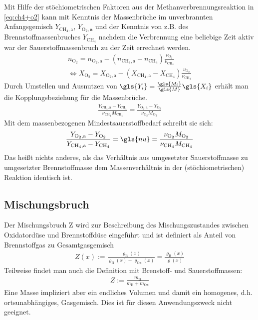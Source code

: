 Mit Hilfe der stöchiometrischen Faktoren aus der Methanverbrennungsreaktion in \autoref{eq:ch4+o2} kann mit Kenntnis der Massenbrüche im unverbrannten Anfangsgemisch $Y_{\mathrm{CH}_4,\text{a}}$, $Y_{\mathrm{O}_2,\textbf{a}}$ und der Kenntnis von z.B. des Brennstoffmassenbruches $Y_{\mathrm{CH}_4}$ nachdem die Verbrennung eine beliebige Zeit aktiv war der Sauerstoffmassenbruch zu der Zeit errechnet werden.
\label{pg:anfangsgemisch}
\begin{align}
    n_{\mathrm{O}_2} = n_{\mathrm{O}_2,\text{a}} - \left( n_{\mathrm{CH}_4,\text{a}}-n_{\mathrm{CH}_4} \right) \frac{ \nu_{\mathrm{O}_2} }{ \nu_{\mathrm{CH}_4} } \\
    \Leftrightarrow
    X_{\mathrm{O}_2} = X_{\mathrm{O}_2,\text{a}} - \left( X_{\mathrm{CH}_4,\text{a}}-X_{\mathrm{CH}_4} \right) \frac{ \nu_{\mathrm{O}_2} }{ \nu_{\mathrm{CH}_4} }
\end{align}
Durch Umstellen und Ausnutzen von $\gls{Y_i} = \frac{ \gls{M_i} }{ \gls{M} } \gls{X_i}$ erhält man die Kopplungsbeziehung für die Massenbrüche.
\begin{align}
   \frac{ Y_{\mathrm{CH}_4,\text{a}} - Y_{\mathrm{CH}_4} }{ \nu_{\mathrm{CH}_4} M_{\mathrm{CH}_4} }
   = \frac{ Y_{\mathrm{O}_2,\text{a}} - Y_{\mathrm{O}_2} }{ \nu_{\mathrm{O}_2} M_{\mathrm{O}_2} }
\end{align}
Mit dem massenbezogenen Mindestsauerstoffbedarf schreibt sie sich:
\begin{align}
    \label{eq:kopplungsbeziehung}
    \frac{ Y_{\mathrm{O}_2 ,\text{a}} - Y_{\mathrm{O}_2} }
         { Y_{\mathrm{CH}_4,\text{a}} - Y_{\mathrm{CH}_4} }
    = \gls{nu}
    = \frac{ \nu_{\mathrm{O}_2}  M_{\mathrm{O}_2} }
           { \nu_{\mathrm{CH}_4} M_{\mathrm{CH}_4} }
\end{align}
Das heißt nichts anderes, als das Verhältnis aus umgesetzter Sauerstoffmasse zu umgesetzter Brennstoffmasse dem Massenverhältnis in der (stöchiometrischen) Reaktion identisch ist.


\subsection{Mischungsbruch}
\label{sct:mischungsbruch}

Der Mischungsbruch \gls{Z} wird zur Beschreibung des Mischungszustandes zwischen Oxidatordüse und Brennstoffdüse eingeführt und ist definiert als Anteil von Brennstoffgas zu Gesamtgasgemisch\cite[559]{merker2009grundlagen}
\begin{align}
    \label{eq:defZ}
    Z(x) := \frac{ \varrho_\text{B}(x) }{ \varrho_\text{B}(x) + \varrho_\text{Ox}(x) }
    = \frac{ \varrho_\text{B}(x) }{ \varrho(x) }
\end{align}
Teilweise findet man auch die Definition mit Brenstoff- und Sauerstoffmassen:
\begin{align}
    Z := \frac{ m_\text{B} }{ m_\text{B} + m_\text{Ox} }
\end{align}
Eine Masse impliziert aber ein endliches Volumen und damit ein homogenes, d.h. ortsunabhängiges, Gasgemisch. Dies ist für diesen Anwendungszweck nicht geeignet.

